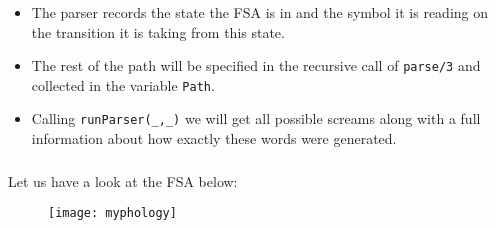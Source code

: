 \begin{frame}

	\frametitle{\insertsection}
	\framesubtitle{\insertsubsection}
	
	\begin{itemize}
		\item The parser records the state the FSA is in and the symbol it is reading on the transition it is taking from this state.
		\item The rest of the path will be specified in the recursive call of \texttt{parse/3} and collected in the variable \texttt{Path}.
		\item Calling \texttt{runParser(\_,\_)} we will get all possible screams along with a full information about how exactly these words were generated.
	\end{itemize}

\end{frame}


\begin{frame}

	\frametitle{\insertsection}
	\framesubtitle{\insertsubsection}
	
	Let us have a look at the FSA below:
	
	\begin{figure}
		\texttt{[image: myphology]}
	\end{figure}


\end{frame}





